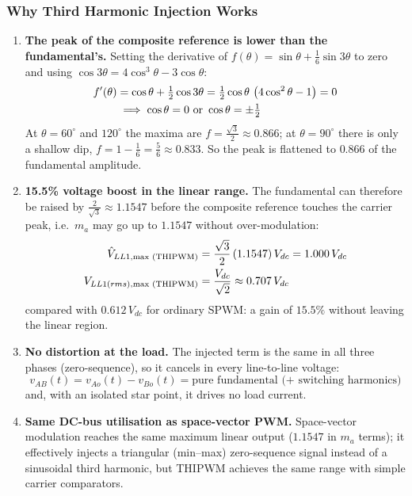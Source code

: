 \documentclass[11pt,a4paper]{article}
\begin{document}
\subsubsection{Why Third Harmonic Injection Works}
\begin{conceptbox}
\begin{enumerate}
  \item \textbf{The peak of the composite reference is lower than the fundamental's.} Setting the derivative of $f(\theta) = \sin\theta + \frac{1}{6}\sin 3\theta$ to zero and using $\cos 3\theta = 4\cos^3\theta - 3\cos\theta$:
  \begin{align}
  f'(\theta) &= \cos\theta + \tfrac{1}{2}\cos 3\theta = \tfrac{1}{2}\cos\theta\,\left(4\cos^2\theta - 1\right) = 0 \notag\\
  &\implies \cos\theta = 0 \ \text{or}\ \cos\theta = \pm\tfrac{1}{2} \notag
  \end{align}
  At $\theta = 60^\circ$ and $120^\circ$ the maxima are $f = \frac{\sqrt{3}}{2} \approx 0.866$; at $\theta = 90^\circ$ there is only a shallow dip, $f = 1 - \frac{1}{6} = \frac{5}{6} \approx 0.833$. So the peak is flattened to $0.866$ of the fundamental amplitude.
  \item \textbf{15.5\% voltage boost in the linear range.} The fundamental can therefore be raised by $\frac{2}{\sqrt{3}} \approx 1.1547$ before the composite reference touches the carrier peak, i.e.\ $m_a$ may go up to $1.1547$ without over-modulation:
  \begin{align}
  \hat{V}_{LL1,\text{max (THIPWM)}} &= \frac{\sqrt{3}}{2}\,(1.1547)\,V_{dc} = 1.000\,V_{dc} \notag\\
  V_{LL1(rms),\text{max (THIPWM)}} &= \frac{V_{dc}}{\sqrt{2}} \approx 0.707\,V_{dc} \notag
  \end{align}
  compared with $0.612\,V_{dc}$ for ordinary SPWM: a gain of $15.5\%$ without leaving the linear region.
  \item \textbf{No distortion at the load.} The injected term is the same in all three phases (zero-sequence), so it cancels in every line-to-line voltage:
  \begin{equation}
  v_{AB}(t) = v_{Ao}(t) - v_{Bo}(t) = \text{pure fundamental (+ switching harmonics)}
  \end{equation}
  and, with an isolated star point, it drives no load current.
  \item \textbf{Same DC-bus utilisation as space-vector PWM.} Space-vector modulation reaches the same maximum linear output ($1.1547$ in $m_a$ terms); it effectively injects a triangular (min--max) zero-sequence signal instead of a sinusoidal third harmonic, but THIPWM achieves the same range with simple carrier comparators.
\end{enumerate}
\end{conceptbox}
\end{document}
